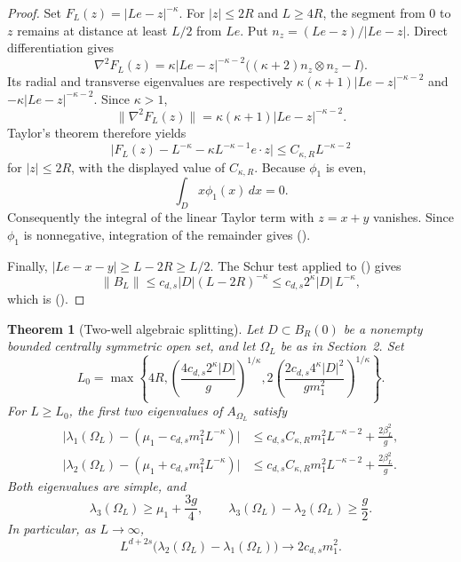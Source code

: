 \documentclass[twoside,10pt]{article}
\numberwithin{equation}{section}
\theoremstyle{slbody}
\newtheorem{theorem}{Theorem}[section]
\theoremstyle{definition}
\newcommand{\norm}[1]{\lVert #1\rVert}
\newcommand{\abs}[1]{\lvert #1\rvert}
\renewcommand{\eqref}[1]{%
  \textup{{\normalfont(\oldstylenums{\ref{#1}}}\normalfont)}}
\begin{document}
\begin{proof}
Set $F_L(z)=\abs{Le-z}^{-\kappa}$.  For $\abs z\leq2R$ and $L\geq4R$,
the segment from $0$ to $z$ remains at distance at least $L/2$ from $Le$.
Put $n_z=(Le-z)/\abs{Le-z}$.  Direct differentiation gives
\[
 \nabla^2F_L(z)
 =\kappa\abs{Le-z}^{-\kappa-2}
   \bigl((\kappa+2)n_z\otimes n_z-I\bigr).
\]
Its radial and transverse eigenvalues are respectively
$\kappa(\kappa+1)\abs{Le-z}^{-\kappa-2}$ and
$-\kappa\abs{Le-z}^{-\kappa-2}$.  Since $\kappa>1$,
\[
 \norm{\nabla^2F_L(z)}
 =\kappa(\kappa+1)\abs{Le-z}^{-\kappa-2}.
\]
Taylor's theorem therefore yields
\[
 \abs{F_L(z)-L^{-\kappa}
 -\kappa L^{-\kappa-1}e\cdot z}
 \leq C_{\kappa,R}L^{-\kappa-2}
\]
for $\abs z\leq2R$, with the displayed value of $C_{\kappa,R}$.
Because $\phi_1$ is even,
\[
 \int_Dx\phi_1(x)\,dx=0.
\]
Consequently the integral of the linear Taylor term with $z=x+y$ vanishes.
Since $\phi_1$ is nonnegative, integration of the remainder gives
\eqref{eq:kernel-expansion}.

Finally, $\abs{Le-x-y}\geq L-2R\geq L/2$.  The Schur test applied to
\eqref{eq:B} gives
\[
 \norm{B_L}
 \leq c_{d,s}\abs D(L-2R)^{-\kappa}
 \leq c_{d,s}2^\kappa\abs D\,L^{-\kappa},
\]
which is \eqref{eq:Bnorm}.
\end{proof}

\begin{theorem}[Two-well algebraic splitting]\label{thm:two-well}
Let $D\subset B_R(0)$ be a nonempty bounded centrally symmetric open set, and
let $\Omega_L$ be as in Section~2.  Set
\begin{equation}\label{eq:explicit-L0}
 L_0=\max\left\{
  4R,
  \left(\frac{4c_{d,s}2^\kappa\abs D}{g}\right)^{1/\kappa},
  2\left(\frac{2c_{d,s}4^\kappa\abs{D}^2}
  {gm_1^2}\right)^{1/\kappa}
 \right\}.
\end{equation}
For $L\geq L_0$, the first two eigenvalues of $A_{\Omega_L}$ satisfy
\begin{align}
 \abs{\lambda_1(\Omega_L)
  -(\mu_1-c_{d,s}m_1^2L^{-\kappa})}
 &\leq c_{d,s}C_{\kappa,R}m_1^2L^{-\kappa-2}
       +\frac{2\beta_L^2}{g},\label{eq:lambda1}\\
 \abs{\lambda_2(\Omega_L)
  -(\mu_1+c_{d,s}m_1^2L^{-\kappa})}
 &\leq c_{d,s}C_{\kappa,R}m_1^2L^{-\kappa-2}
       +\frac{2\beta_L^2}{g}.\label{eq:lambda2}
\end{align}
Both eigenvalues are simple, and
\begin{equation}\label{eq:two-well-third-level}
 \lambda_3(\Omega_L)\geq\mu_1+\frac{3g}{4},
 \qquad
 \lambda_3(\Omega_L)-\lambda_2(\Omega_L)\geq\frac g2.
\end{equation}
In particular, as $L\to\infty$,
\begin{equation}\label{eq:gap-limit}
 L^{d+2s}\bigl(\lambda_2(\Omega_L)-\lambda_1(\Omega_L)\bigr)
 \longrightarrow 2c_{d,s}m_1^2.
\end{equation}
\end{theorem}
\end{document}
